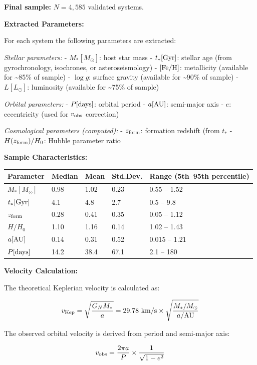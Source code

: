 \documentclass[10pt,a4paper]{article}
\begin{document}
\textbf{Final sample:} \(N = 4,585\) validated systems.

\textbf{Extracted Parameters:}

For each system the following parameters are extracted:

\emph{Stellar parameters:} - \(M_* [M_\odot]\): host star mass -
\(t_* [\rm Gyr]\): stellar age (from gyrochronology, isochrones, or
asteroseismology) - \([{\rm Fe/H}]\): metallicity (available for
\textasciitilde85\% of sample) - \(\log g\): surface gravity (available
for \textasciitilde90\% of sample) - \(L [L_\odot]\): luminosity
(available for \textasciitilde75\% of sample)

\emph{Orbital parameters:} - \(P [\rm days]\): orbital period -
\(a [\rm AU]\): semi-major axis - \(e\): eccentricity (used for
\(v_{\rm obs}\) correction)

\emph{Cosmological parameters (computed):} - \(z_{\rm form}\): formation
redshift (from \(t_*\) - \(H(z_{\rm form})/H_0\): Hubble parameter
ratio

\textbf{Sample Characteristics:}

\begin{longtable}[]{@{}lllll@{}}
\toprule\noalign{}
Parameter & Median & Mean & Std.Dev. & Range (5th--95th percentile) \\
\midrule\noalign{}
\endhead
\bottomrule\noalign{}
\endlastfoot
\(M_* [M_\odot]\) & 0.98 & 1.02 & 0.23 & 0.55 -- 1.52 \\
\(t_* [\rm Gyr]\) & 4.1 & 4.8 & 2.7 & 0.5 -- 9.8 \\
\(z_{\rm form}\) & 0.28 & 0.41 & 0.35 & 0.05 -- 1.12 \\
\(H/H_0\) & 1.10 & 1.16 & 0.14 & 1.02 -- 1.43 \\
\(a [\rm AU]\) & 0.14 & 0.31 & 0.52 & 0.015 -- 1.21 \\
\(P [\rm days]\) & 14.2 & 38.4 & 67.1 & 2.1 -- 180 \\
\end{longtable}

\textbf{Velocity Calculation:}

The theoretical Keplerian velocity is calculated as:

\[v_{\rm Kep} = \sqrt{\frac{G_N M_*}{a}} = 29.78~{\rm km/s} \times \sqrt{\frac{M_*/M_\odot}{a/{\rm AU}}}\]

The observed orbital velocity is derived from period and semi-major
axis:

\[v_{\rm obs} = \frac{2\pi a}{P} \times \frac{1}{\sqrt{1-e^2}}\]
\end{document}
